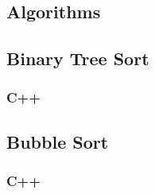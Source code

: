 \documentclass{subfile}
\begin{document}
\begin{appendices}
\section{Algorithms}
\subsection{Binary Tree Sort}\label{APENDIX:BT}
\subsubsection{C++}


\newpage
\subsection{Bubble Sort}\label{APENDIX:B}
\subsubsection{C++}
  
  
\end{appendices}
\end{document}
